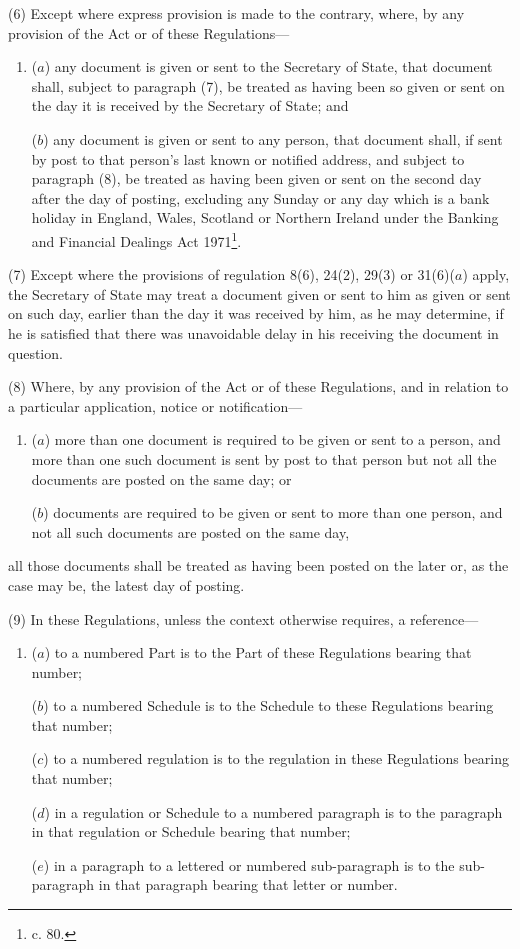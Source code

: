 \documentclass[a4paper]{article}
\begin{document}
(6) Except where express provision is made to the contrary, where, by any provision of the Act or of these Regulations—
\begin{enumerate}\item[]
($a$) any document is given or sent to the Secretary of State, that document shall, subject to paragraph (7), be treated as having been so given or sent on the day it is received by the Secretary of State; and

($b$) any document is given or sent to any person, that document shall, if sent by post to that person’s last known or notified address, and subject to paragraph (8), be treated as having been given or sent on the second day after the day of posting, excluding any Sunday or any day which is a bank holiday in England, Wales, Scotland or Northern Ireland under the Banking and Financial Dealings Act 1971\footnote{ c. 80.}.
\end{enumerate}

(7) Except where the provisions of regulation 8(6), 24(2), 29(3) or 31(6)($a$) apply, the Secretary of State may treat a document given or sent to him as given or sent on such day, earlier than the day it was received by him, as he may determine, if he is satisfied that there was unavoidable delay in his receiving the document in question.

(8) Where, by any provision of the Act or of these Regulations, and in relation to a particular application, notice or notification—
\begin{enumerate}\item[]
($a$) more than one document is required to be given or sent to a person, and more than one such document is sent by post to that person but not all the documents are posted on the same day; or

($b$) documents are required to be given or sent to more than one person, and not all such documents are posted on the same day,
\end{enumerate}
all those documents shall be treated as having been posted on the later or, as the case may be, the latest day of posting.

(9) In these Regulations, unless the context otherwise requires, a reference—
\begin{enumerate}\item[]
($a$) to a numbered Part is to the Part of these Regulations bearing that number;

($b$) to a numbered Schedule is to the Schedule to these Regulations bearing that number;

($c$) to a numbered regulation is to the regulation in these Regulations bearing that number;

($d$) in a regulation or Schedule to a numbered paragraph is to the paragraph in that regulation or Schedule bearing that number;

($e$) in a paragraph to a lettered or numbered sub-paragraph is to the sub-paragraph in that paragraph bearing that letter or number.
\end{enumerate}
\end{document}
